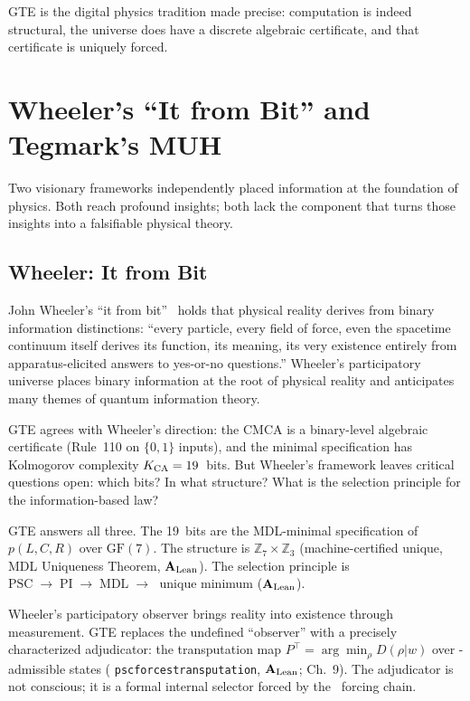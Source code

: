 \documentclass[11pt,openany]{book}
\theoremstyle{remark}
\newcommand{\MDL}{\text{MDL}}
\newcommand{\PSC}{\text{PSC}}
\newcommand{\ZS}{\mathbb{Z}_7}
\newcommand{\lean}[1]{%
  \penalty-100
  \begingroup\def\_{\textunderscore\allowbreak}\texttt{#1}\endgroup}
\newcommand{\poly}{p(L,C,R)}
\newcommand{\CatAL}{\ensuremath{\textbf{A}_{\rm Lean}}}
\begin{document}
GTE is the digital physics tradition made precise: computation is indeed structural, the
universe does have a discrete algebraic certificate, and that certificate is uniquely
forced.

\section{Wheeler's ``It from Bit'' and Tegmark's MUH}
\label{sec:wheeler_tegmark}

Two visionary frameworks independently placed information at the foundation of physics.
Both reach profound insights; both lack the component that turns those insights into a
falsifiable physical theory.

\subsection*{Wheeler: It from Bit}

John Wheeler's ``it from bit''~\cite{wheeler1989} holds that physical reality derives
from binary information distinctions: ``every particle, every field of force, even the
spacetime continuum itself derives its function, its meaning, its very existence entirely
from apparatus-elicited answers to yes-or-no questions.''  Wheeler's participatory
universe places binary information at the root of physical reality and anticipates many
themes of quantum information theory.

GTE agrees with Wheeler's direction: the CMCA is a binary-level algebraic certificate
(Rule~110 on $\{0,1\}$ inputs), and the minimal specification has Kolmogorov complexity
$K_{\rm CA} = 19$~bits.  But Wheeler's framework leaves critical questions open: which
bits?  In what structure?  What is the selection principle for the information-based law?

GTE answers all three.  The 19~bits are the MDL-minimal specification of $\poly$ over
$\mathrm{GF}(7)$.  The structure is $\ZS\times\mathbb{Z}_3$ (machine-certified unique,
MDL Uniqueness Theorem, \CatAL).  The selection principle is $\PSC\;\to\;\text{PI}\;\to\;\MDL\;\to\;$
unique minimum (\CatAL).

Wheeler's participatory observer brings reality into existence through measurement.  GTE
replaces the undefined ``observer'' with a precisely characterized adjudicator: the
transputation map $P^\top = \arg\min_\rho D(\rho|w)$ over \PSC-admissible states
(\lean{psc\_forces\_transputation}, \CatAL; Ch.~9).  The adjudicator is not
conscious; it is a formal internal selector forced by the \PSC\ forcing chain.
\end{document}
